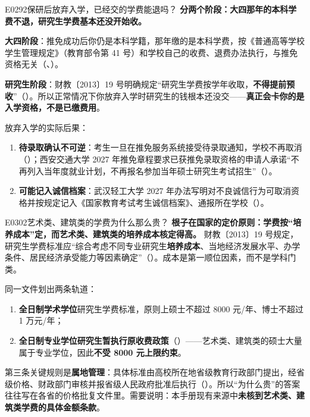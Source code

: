 \begin{qa}{E0292}{保研后放弃入学，已经交的学费能退吗？}
\textbf{分两个阶段：大四那年的本科学费不退，研究生学费基本还没开始收。}

\textbf{大四阶段}：推免成功后你仍是本科学籍，那年缴的是本科学费，按《普通高等学校学生管理规定》（教育部令第 41 号）和学校自己的收费、退费办法执行，与推免资格无关（、）。

\textbf{研究生阶段}：财教〔2013〕19 号明确规定“研究生学费按学年收取，\textbf{不得提前预收}”（）。所以正常情况下你放弃入学时研究生的钱根本还没交——\textbf{真正会卡你的是入学资格，不是已缴费用}。

放弃入学的实际后果：

\begin{enumerate}
  \item \textbf{待录取确认不可逆}：考生一旦在推免服务系统接受待录取通知，学校不再取消（）；西安交通大学 2027 年推免章程要求已获推免录取资格的申请人承诺“不再列入当年度就业计划，不再报名参加当年硕士研究生考试招生”（）。
  \item \textbf{可能记入诚信档案}：武汉轻工大学 2027 年办法写明对不良诚信行为可取消资格并按规定记入《国家教育考试考生诚信档案》、通报所在学校（）。
\end{enumerate}
\end{qa}

\begin{qa}{E0302}{艺术类、建筑类的学费为什么那么贵？}
\textbf{根子在国家的定价原则：学费按“培养成本”定，而艺术类、建筑类的培养成本核定得高。} 财教〔2013〕19 号规定，研究生学费标准应“综合考虑不同专业研究生\textbf{培养成本}、当地经济发展水平、办学条件、居民经济承受能力等因素确定”（）。成本是第一顺位因素，而不是学科门类。

同一文件划出两条轨道：

\begin{enumerate}
  \item \textbf{全日制学术学位}研究生学费标准，原则上硕士不超过 8000 元/年、博士不超过 1 万元/年；
  \item \textbf{全日制专业学位研究生暂执行原收费政策}（）——艺术类、建筑类的硕士大量属于专业学位，因此\textbf{不受 8000 元上限约束}。
\end{enumerate}

第三条关键规则是\textbf{属地管理}：具体标准由高校所在地省级教育行政部门提出，经省级价格、财政部门审核并报省级人民政府批准后执行（）。所以“为什么贵”的答案往往写在各省的价格批复文件里。需要说明：本手册现有来源中\textbf{未核到艺术类、建筑类学费的具体金额条款}。
\end{qa}

